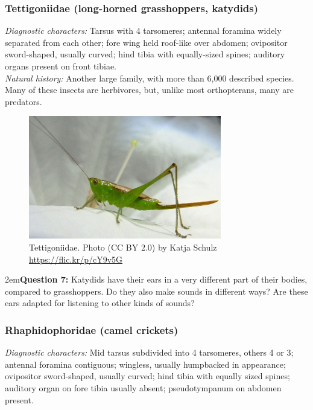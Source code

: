 \documentclass[letterpaper, 11pt]{article}
\begin{document}
\subsubsection{Tettigoniidae (long-horned grasshoppers, katydids)}
\noindent{}\textit{Diagnostic characters:} Tarsus with 4 tarsomeres; antennal foramina widely separated from each other; fore wing held roof-like over abdomen; ovipositor sword-shaped, usually curved; hind tibia with equally-sized spines; auditory organs present on front tibiae.\\

\noindent{}\textit{Natural history:} Another large family, with more than 6,000 described species. Many of these insects are herbivores, but, unlike most orthopterans, many are predators.\\

\begin{figure}[ht!]
  \centering
    \includegraphics[width=0.75\textwidth]{tetti1}
  \caption{Tettigoniidae. Photo (CC BY 2.0) by Katja Schulz \url{https://flic.kr/p/cY9v5G}}
  \label{fig:tettihabitus}
\end{figure}

\hangindent2em\textbf{Question 7:} Katydids have their ears in a very different part of their bodies, compared to grasshoppers. Do they also make sounds in different ways? Are these ears adapted for listening to other kinds of sounds?\\

\subsubsection{Rhaphidophoridae (camel crickets)}
\noindent{}\textit{Diagnostic characters:} Mid tarsus subdivided into 4 tarsomeres, others 4 or 3; antennal foramina contiguous; wingless, usually humpbacked in appearance; ovipositor sword-shaped, usually curved; hind tibia with equally sized spines; auditory organ on fore tibia usually absent; pseudotympanum on abdomen present.\\
\end{document}
